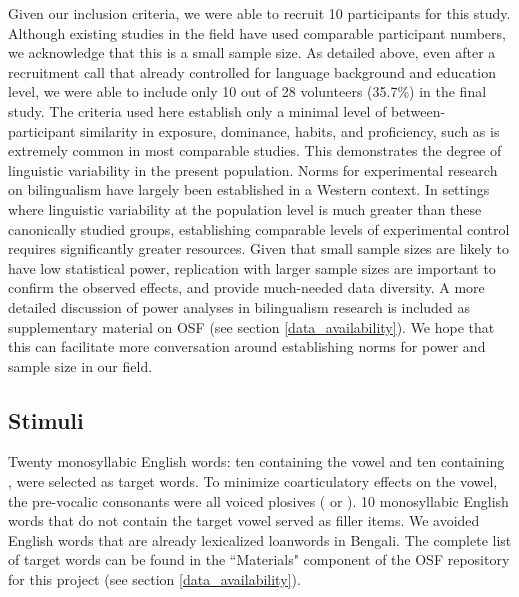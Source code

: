 \documentclass[12 pt]{article}
\newcommand{\nt}[1]{\textipa{[#1]}} %
\begin{document}
Given our inclusion criteria, we were able to recruit 10 participants for this study. Although existing studies in the field have used comparable participant numbers, we acknowledge that this is a small sample size. As detailed above, even after a recruitment call that already controlled for language background and education level, we were able to include only 10 out of 28 volunteers (35.7\%) in the final study. The criteria used here establish only a minimal level of between-participant similarity in exposure, dominance, habits, and proficiency, such as is extremely common in most comparable studies. This demonstrates the degree of linguistic variability in the present population. Norms for experimental research on bilingualism have largely been established in a Western context. In settings where linguistic variability at the population level is much greater than these canonically studied groups, establishing comparable levels of experimental control requires significantly greater resources. Given that small sample sizes are likely to have low statistical power, replication with larger sample sizes are important to confirm the observed effects, and provide much-needed data diversity. A more detailed discussion of power analyses in bilingualism research is included as supplementary material on OSF (see section \ref{data_availability}). We hope that this can facilitate more conversation around establishing norms for power and sample size in our field.  


\subsection{Stimuli}
Twenty monosyllabic English words: ten containing the vowel \nt{2} and ten containing \nt{\ae}, were selected as target words. To minimize coarticulatory effects on the vowel, the pre-vocalic consonants were all voiced plosives (\nt{b} or \nt{d}). 10 monosyllabic English words that do not contain the target vowel served as filler items. We avoided English words that are already lexicalized loanwords in Bengali. The complete list of target words can be found in the ``Materials" component of the OSF repository for this project (see section \ref{data_availability}).
\end{document}
